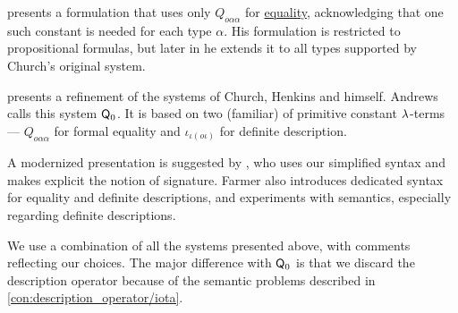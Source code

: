 \begin{remark}
   presents a formulation that uses only \( Q_{o \alpha \alpha } \) for \hyperref[def:predicate_logic_alphabet/equality]{equality}, acknowledging that one such constant is needed for each type \( \alpha \). His formulation is restricted to propositional formulas, but later in \cite{Henkin1975Identity} he extends it to all types supported by Church's original system.

   presents a refinement of the systems of Church, Henkins and himself. Andrews calls this system \( \textsf{Q}_0 \). It is based on two (familiar) of primitive constant \( {\mathrm \lambda} \)-terms --- \( Q_{o \alpha \alpha} \) for formal equality and \( \iota_{\iota (o \iota)} \) for definite description.

  A modernized presentation is suggested by , who uses our simplified syntax and makes explicit the notion of signature. Farmer also introduces dedicated syntax for equality and definite descriptions, and experiments with semantics, especially regarding definite descriptions.

  We use a combination of all the systems presented above, with comments reflecting our choices. The major difference with \( \textsf{Q}_0 \) is that we discard the description operator because of the semantic problems described in \cref{con:description_operator/iota}.
\end{remark}

